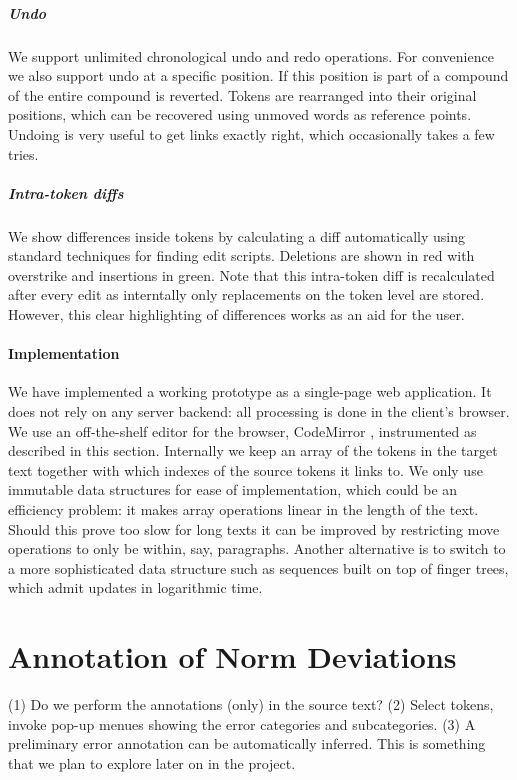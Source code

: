 \documentclass[10pt, a4paper]{article}
\begin{document}
\subparagraph{Undo} We support unlimited chronological undo and redo operations.
For convenience we also support undo at a specific position. %
If this position is part of a compound of the entire compound is reverted. %
Tokens are rearranged into their original positions, which
can be recovered using unmoved words as reference points.
Undoing is very useful to get links exactly right, which occasionally takes a
few tries.

\subparagraph{Intra-token diffs} We show differences inside tokens by
calculating a diff automatically using standard techniques for finding
edit scripts.  Deletions are shown in red with overstrike and insertions
in green.  Note that this intra-token diff is recalculated after every edit
as interntally only replacements on the token level are stored.  However,
this clear highlighting of differences works as an aid for the user.

\paragraph{Implementation}
We have implemented a working prototype as a single-page web application.
It does not rely on any server backend: all processing is done in the
client's browser. We use an off-the-shelf editor for the browser,
CodeMirror \cite{CodeMirror},
instrumented as described in this section.
Internally we keep an array of the tokens in the target text together with
which indexes of the source tokens it links to.  We only use immutable data
structures for ease of implementation,  which could be an efficiency problem:
it makes array operations linear in the length of the text. Should
this prove too slow for long texts it can be improved by restricting move
operations to only be within, say, paragraphs. Another alternative is to
switch to a more sophisticated data structure such as sequences built on
top of finger trees, which admit updates in logarithmic time.

\section{Annotation of Norm Deviations}
\label{sec:ann_tool}

(1) Do we perform the annotations (only) in the source text?
(2) Select tokens, invoke pop-up menues showing the error categories and
subcategories.
(3) A preliminary error annotation can be automatically inferred. This is
something that we plan to explore later on in the project.
\end{document}
